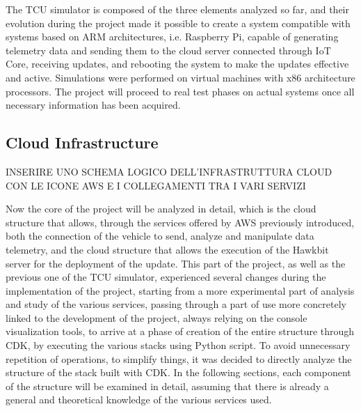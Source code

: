 The TCU simulator is composed of the three elements analyzed so far, and their evolution during the project made it possible to create a system compatible with systems based on ARM architectures, i.e. Raspberry Pi, capable of generating telemetry data and sending them to the cloud server connected through IoT Core, receiving updates, and rebooting the system to make the updates effective and active. Simulations were performed on virtual machines with x86 architecture processors. The project will proceed to real test phases on actual systems once all necessary information has been acquired.

\subsection{Cloud Infrastructure}
INSERIRE UNO SCHEMA LOGICO DELL'INFRASTRUTTURA CLOUD CON LE ICONE AWS E I COLLEGAMENTI TRA I VARI SERVIZI

Now the core of the project will be analyzed in detail, which is the cloud structure that allows, through the services offered by AWS previously introduced, both the connection of the vehicle to send, analyze and manipulate data telemetry, and the cloud structure that allows the execution of the Hawkbit server for the deployment of the update. This part of the project, as well as the previous one of the TCU simulator, experienced several changes during the implementation of the project, starting from a more experimental part of analysis and study of the various services, passing through a part of use more concretely linked to the development of the project, always relying on the console visualization tools, to arrive at a phase of creation of the entire structure through CDK, by executing the various stacks using Python script. To avoid unnecessary repetition of operations, to simplify things, it was decided to directly analyze the structure of the stack built with CDK. In the following sections, each component of the structure will be examined in detail, assuming that there is already a general and theoretical knowledge of the various services used.

